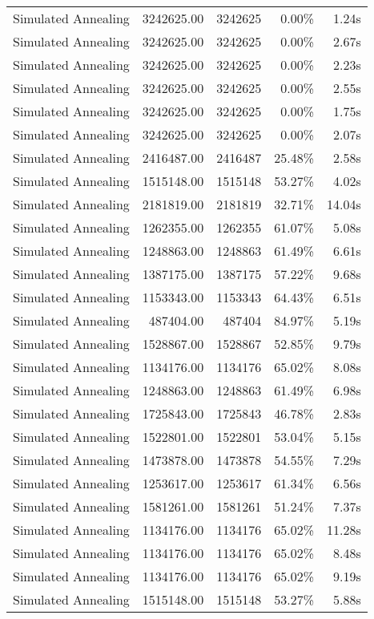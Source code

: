\begin{table}[ht]
\begin{tabular}{|r|r|r|r|r|}
Simulated Annealing & 3242625.00 & 3242625 & 0.00\% & 1.24s\\
Simulated Annealing & 3242625.00 & 3242625 & 0.00\% & 2.67s\\
Simulated Annealing & 3242625.00 & 3242625 & 0.00\% & 2.23s\\
Simulated Annealing & 3242625.00 & 3242625 & 0.00\% & 2.55s\\
Simulated Annealing & 3242625.00 & 3242625 & 0.00\% & 1.75s\\
Simulated Annealing & 3242625.00 & 3242625 & 0.00\% & 2.07s\\
Simulated Annealing & 2416487.00 & 2416487 & 25.48\% & 2.58s\\
Simulated Annealing & 1515148.00 & 1515148 & 53.27\% & 4.02s\\
Simulated Annealing & 2181819.00 & 2181819 & 32.71\% & 14.04s\\
Simulated Annealing & 1262355.00 & 1262355 & 61.07\% & 5.08s\\
Simulated Annealing & 1248863.00 & 1248863 & 61.49\% & 6.61s\\
Simulated Annealing & 1387175.00 & 1387175 & 57.22\% & 9.68s\\
Simulated Annealing & 1153343.00 & 1153343 & 64.43\% & 6.51s\\
Simulated Annealing & 487404.00 & 487404 & 84.97\% & 5.19s\\
Simulated Annealing & 1528867.00 & 1528867 & 52.85\% & 9.79s\\
Simulated Annealing & 1134176.00 & 1134176 & 65.02\% & 8.08s\\
Simulated Annealing & 1248863.00 & 1248863 & 61.49\% & 6.98s\\
Simulated Annealing & 1725843.00 & 1725843 & 46.78\% & 2.83s\\
Simulated Annealing & 1522801.00 & 1522801 & 53.04\% & 5.15s\\
Simulated Annealing & 1473878.00 & 1473878 & 54.55\% & 7.29s\\
Simulated Annealing & 1253617.00 & 1253617 & 61.34\% & 6.56s\\
Simulated Annealing & 1581261.00 & 1581261 & 51.24\% & 7.37s\\
Simulated Annealing & 1134176.00 & 1134176 & 65.02\% & 11.28s\\
Simulated Annealing & 1134176.00 & 1134176 & 65.02\% & 8.48s\\
Simulated Annealing & 1134176.00 & 1134176 & 65.02\% & 9.19s\\
Simulated Annealing & 1515148.00 & 1515148 & 53.27\% & 5.88s\\

\end{tabular}
\end{table}
